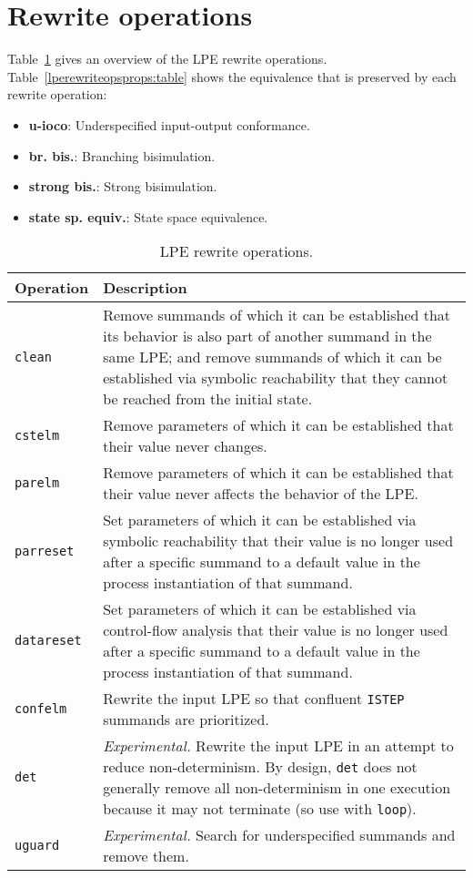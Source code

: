 \section{Rewrite operations}

Table~\ref{lperewriteops:table} gives an overview of the LPE rewrite operations.
Table~\ref{lperewriteopsprops:table} shows the equivalence that is preserved by each rewrite operation:
\begin{itemize}
\item \textbf{u-ioco}: Underspecified input-output conformance.
\item \textbf{br. bis.}: Branching bisimulation.
\item \textbf{strong bis.}: Strong bisimulation.
\item \textbf{state sp. equiv.}: State space equivalence.
\end{itemize}

\begin{table}[!ht]
\begin{center}
\begin{tabularx}{\linewidth}{l|X|}
\textbf{Operation} & \textbf{Description} \\ \hline
\texttt{clean} & Remove summands of which it can be established that its behavior is also part of another summand in the same LPE; and remove summands of which it can be established via symbolic reachability that they cannot be reached from the initial state. \\ \hline
\texttt{cstelm} & Remove parameters of which it can be established that their value never changes. \\ \hline
\texttt{parelm} & Remove parameters of which it can be established that their value never affects the behavior of the LPE. \\ \hline
\texttt{parreset} & Set parameters of which it can be established via symbolic reachability that their value is no longer used after a specific summand to a default value in the process instantiation of that summand. \\ \hline
\texttt{datareset} & Set parameters of which it can be established via control-flow analysis that their value is no longer used after a specific summand to a default value in the process instantiation of that summand. \\ \hline
\texttt{confelm} & Rewrite the input LPE so that confluent \texttt{ISTEP} summands are prioritized. \\ \hline
\texttt{det} & \textit{Experimental.} Rewrite the input LPE in an attempt to reduce non-determinism. By design, \texttt{det} does not generally remove all non-determinism in one execution because it may not terminate (so use with \texttt{loop}). \\ \hline
\texttt{uguard} & \textit{Experimental.} Search for underspecified summands and remove them. \\ \hline
\end{tabularx}
\caption{LPE rewrite operations.}
\label{lperewriteops:table}
\end{center}
\end{table}

